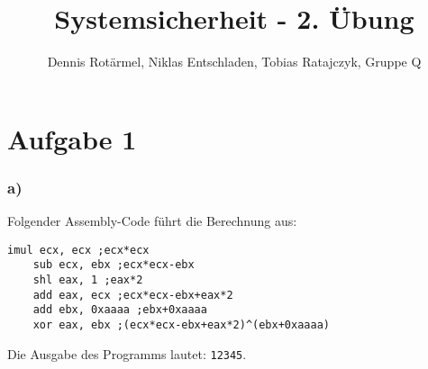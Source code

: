 \documentclass[]{scrreprt}
\title{Systemsicherheit - 2. Übung}
\author{Dennis Rotärmel, Niklas Entschladen, Tobias Ratajczyk, Gruppe Q}
\begin{document}
	
	\maketitle
	\chapter{Aufgabe 1}
	\subsection*{a)}
	Folgender Assembly-Code führt die Berechnung aus:
	\begin{lstlisting}[caption={Assembler Code "Erstes Programm"},captionpos=b]
	imul ecx, ecx ;ecx*ecx
	sub ecx, ebx ;ecx*ecx-ebx
	shl eax, 1 ;eax*2
	add eax, ecx ;ecx*ecx-ebx+eax*2
	add ebx, 0xaaaa ;ebx+0xaaaa
	xor eax, ebx ;(ecx*ecx-ebx+eax*2)^(ebx+0xaaaa)
	\end{lstlisting}
	Die Ausgabe des Programms lautet: \texttt{12345}.
\end{document}
